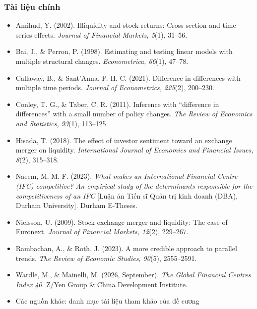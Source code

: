 \documentclass[11pt, xcolor={dvipsnames}, aspectratio=169, usepdftitle=false]{beamer}
\begin{document}
\begin{frame}[allowframebreaks]
\frametitle{Tài liệu chính}
\begin{itemize}
\item Amihud, Y. (2002). Illiquidity and stock returns: Cross-section and time-series effects. \emph{Journal of Financial Markets, 5}(1), 31--56.
\item Bai, J., \& Perron, P. (1998). Estimating and testing linear models with multiple structural changes. \emph{Econometrica, 66}(1), 47--78.
\item Callaway, B., \& Sant'Anna, P. H. C. (2021). Difference-in-differences with multiple time periods. \emph{Journal of Econometrics, 225}(2), 200--230.
\item Conley, T. G., \& Taber, C. R. (2011). Inference with ``difference in differences'' with a small number of policy changes. \emph{The Review of Economics and Statistics, 93}(1), 113--125.
\item Hisada, T. (2018). The effect of investor sentiment toward an exchange merger on liquidity. \emph{International Journal of Economics and Financial Issues, 8}(2), 315--318.
\item Naeem, M. M. F. (2023). \emph{What makes an International Financial Centre (IFC) competitive? An empirical study of the determinants responsible for the competitiveness of an IFC} [Luận án Tiến sĩ Quản trị kinh doanh (DBA), Durham University]. Durham E-Theses.
\item Nielsson, U. (2009). Stock exchange merger and liquidity: The case of Euronext. \emph{Journal of Financial Markets, 12}(2), 229--267.
\item Rambachan, A., \& Roth, J. (2023). A more credible approach to parallel trends. \emph{The Review of Economic Studies, 90}(5), 2555--2591.
\item Wardle, M., \& Mainelli, M. (2026, September). \emph{The Global Financial Centres Index 40}. Z/Yen Group \& China Development Institute.
\item Các nguồn khác: danh mục tài liệu tham khảo của đề cương
\end{itemize}
\end{frame}

\lastslide

\end{document}
